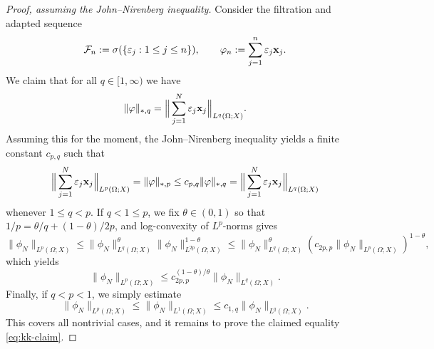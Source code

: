 \begin{proof}[Proof, assuming the John--Nirenberg inequality]
  Consider the filtration and adapted sequence  
  \begin{equation*}
    \mathcal{F}_n := \sigma(\{\varepsilon_j : 1 \leq j \leq n\}), \qquad \varphi_n := \sum_{j=1}^n \varepsilon_j \mathbf{x}_j.
  \end{equation*}
  We claim that for all $q \in [1,\infty)$ we have
  \begin{equation}\label{eq:kk-claim}
    \|\varphi\|_{*,q} = \Big\| \sum_{j=1}^N \varepsilon_j \mathbf{x}_j \Big\|_{L^q(\Omega;X)}.
  \end{equation}
  Assuming this for the moment, the John--Nirenberg inequality yields a finite constant $c_{p,q}$ such that
  \begin{equation*}
    \Big\| \sum_{j=1}^N \varepsilon_j \mathbf{x}_j \Big\|_{L^p(\Omega;X)}
    = \|\varphi\|_{*,p}
    \leq c_{p,q} \|\varphi\|_{*,q}
    = \Big\| \sum_{j=1}^N \varepsilon_j \mathbf{x}_j \Big\|_{L^q(\Omega;X)}
  \end{equation*}
  whenever $1 \leq q < p$.
  If $q < 1 \leq p$, we fix $\theta \in (0,1)$ so that $1/p = \theta/q + (1-\theta)/2p$, and log-convexity of $L^p$-norms gives
  \begin{equation*}
    \| \phi_N \|_{L^p(\Omega;X)}
    \leq \| \phi_N \|_{L^q(\Omega;X)}^{\theta} \| \phi_N \|_{L^{2p}(\Omega;X)}^{1 - \theta}
    \leq \| \phi_N \|_{L^q(\Omega;X)}^{\theta} (c_{2p,p} \| \phi_N \|_{L^{p}(\Omega;X)})^{1 - \theta},
  \end{equation*}
  which yields
  \begin{equation*}
    \| \phi_N \|_{L^p(\Omega;X)} \leq c_{2p,p}^{(1 - \theta)/\theta} \| \phi_N \|_{L^q(\Omega;X)}.
  \end{equation*}
  Finally, if $q < p < 1$, we simply estimate
  \begin{equation*}
    \| \phi_N \|_{L^p(\Omega;X)} \leq \| \phi_N \|_{L^1(\Omega;X)} \leq c_{1,q} \| \phi_N \|_{L^q(\Omega;X)}.
  \end{equation*}
  This covers all nontrivial cases, and it remains to prove the claimed equality \eqref{eq:kk-claim}.


\end{proof}
